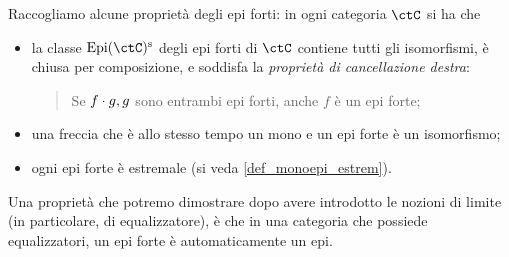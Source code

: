 \begin{proposition}
 Raccogliamo alcune proprietà degli epi forti: in ogni categoria \(\ctC\) si ha che
 \begin{itemize}
  \item la classe \(\Epi[\ctC]^\text{s}\) degli epi forti di \(\ctC\) contiene tutti gli isomorfismi, è chiusa per composizione, e soddisfa la \emph{proprietà di cancellazione destra}:
        \begin{quote}
         Se \(f\cdot g,g\) sono entrambi epi forti, anche \(f\) è un epi forte;
        \end{quote}
  \item una freccia che è allo stesso tempo un mono e un epi forte è un isomorfismo;
  \item ogni epi forte è estremale (si veda \ref{def_monoepi_estrem}).
 \end{itemize}
 Una proprietà che potremo dimostrare dopo avere introdotto le nozioni di limite (in particolare, di equalizzatore), è che in una categoria che possiede equalizzatori, un epi forte è automaticamente un epi.
\end{proposition}
